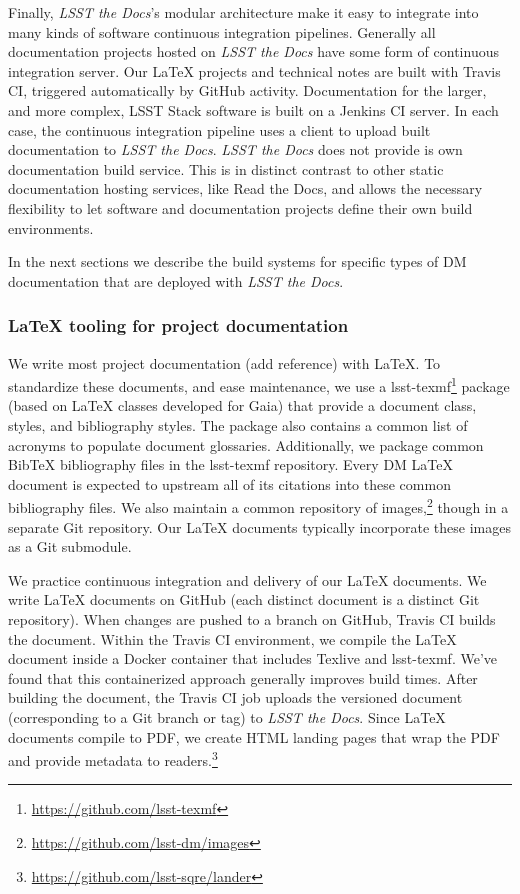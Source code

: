 Finally, \textit{LSST the Docs}'s modular architecture make it easy to integrate into many kinds of software continuous integration pipelines. 
Generally all documentation projects hosted on \textit{LSST the Docs} have some form of continuous integration server.
Our LaTeX projects and technical notes are built with Travis CI, triggered automatically by GitHub activity.
Documentation for the larger, and more complex, LSST Stack software is built on a Jenkins CI server.
In each case, the continuous integration pipeline uses a client to upload built documentation to \textit{LSST the Docs}.
\textit{LSST the Docs} does not provide is own documentation build service.
This is in distinct contrast to other static documentation hosting services, like Read the Docs, and allows the necessary flexibility to let software and documentation projects define their own build environments.

In the next sections we describe the build systems for specific types of DM documentation that are deployed with \textit{LSST the Docs}.

\subsubsection{LaTeX tooling for project documentation}
\label{sec:latex_tooling}

We write most project documentation (add reference) with LaTeX.
To standardize these documents, and ease maintenance, we use a lsst-texmf\footnote{\url{https://github.com/lsst-texmf}} package (based on LaTeX classes developed for Gaia) that provide a document class, styles, and bibliography styles.
The package also contains a common list of acronyms to populate document glossaries.
Additionally, we package common BibTeX bibliography files in the lsst-texmf repository.
Every DM LaTeX document is expected to upstream all of its citations into these common bibliography files.
We also maintain a common repository of images,\footnote{\url{https://github.com/lsst-dm/images}} though in a separate Git repository. 
Our LaTeX documents typically incorporate these images as a Git submodule.

We practice continuous integration and delivery of our LaTeX documents.
We write LaTeX documents on GitHub (each distinct document is a distinct Git repository).
When changes are pushed to a branch on GitHub, Travis CI builds the document.
Within the Travis CI environment, we compile the LaTeX document inside a Docker container that includes Texlive and lsst-texmf.
We've found that this containerized approach generally improves build times.
After building the document, the Travis CI job uploads the versioned document (corresponding to a Git branch or tag) to \textit{LSST the Docs}.
Since LaTeX documents compile to PDF, we create HTML landing pages that wrap the PDF and provide metadata to readers.\footnote{\url{https://github.com/lsst-sqre/lander}}

